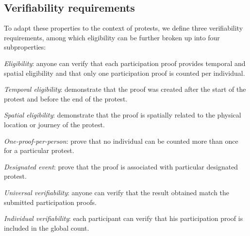 \subsection{Verifiability requirements}%
\label{verifiability-properties}

To adapt these properties to the context of protests, we define three 
verifiability requirements, among which eligibility can be further broken up 
into four subproperties:
\begin{requirements}[V]
  \item\label{EligibilityVerif} \emph{Eligibility}: anyone can verify that each participation proof provides temporal and spatial eligibility and that only one participation proof is counted per individual.
    \begin{requirements}
    \item\label{TemporallyRelated} \emph{Temporal eligibility}: demonstrate that the proof was created after the start of the protest and before the end of the protest.
    \item\label{SpatiallyRelated} \emph{Spatial eligibility}: demonstrate that the proof is spatially related to the physical location or journey of the protest.
    \item\label{CountOnce} \emph{One-proof-per-person}: prove that no individual can be counted more than once for a particular protest.
    \item\label{DesignatedEvent} \emph{Designated event}: prove that the proof is associated with particular designated protest.
    \end{requirements}

  \item\label{UniversalVerif} \emph{Universal verifiability}: anyone can verify that the result obtained match the submitted participation proofs.

  \item\label{IndividualVerif} \emph{Individual verifiability}: each participant can verify that his participation proof is included in the global count.
\end{requirements}

